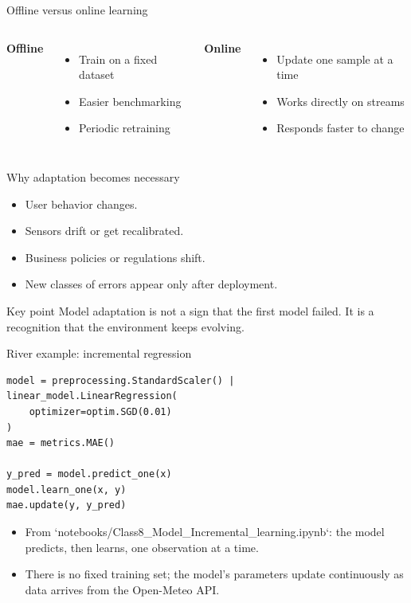 \begin{frame}{Offline versus online learning}
\begin{columns}[T]
\textbf{Offline}
\begin{itemize}
\item Train on a fixed dataset
\item Easier benchmarking
\item Periodic retraining
\end{itemize}
\textbf{Online}
\begin{itemize}
\item Update one sample at a time
\item Works directly on streams
\item Responds faster to change
\end{itemize}
\end{columns}
\coursefooter
\end{frame}

\begin{frame}{Why adaptation becomes necessary}
\begin{itemize}
\item User behavior changes.
\item Sensors drift or get recalibrated.
\item Business policies or regulations shift.
\item New classes of errors appear only after deployment.
\end{itemize}
\begin{block}{Key point}
Model adaptation is not a sign that the first model failed. It is a recognition that the environment keeps evolving.
\end{block}
\coursefooter
\end{frame}

\begin{frame}[fragile]{River example: incremental regression}
\begin{lstlisting}[style=coursepython]
model = preprocessing.StandardScaler() | linear_model.LinearRegression(
    optimizer=optim.SGD(0.01)
)
mae = metrics.MAE()

y_pred = model.predict_one(x)
model.learn_one(x, y)
mae.update(y, y_pred)
\end{lstlisting}
\begin{itemize}
\item From `notebooks/Class8_Model_Incremental_learning.ipynb`: the model predicts, then learns, one observation at a time.
\item There is no fixed training set; the model's parameters update continuously as data arrives from the Open-Meteo API.
\end{itemize}
\coursefooter
\end{frame}

